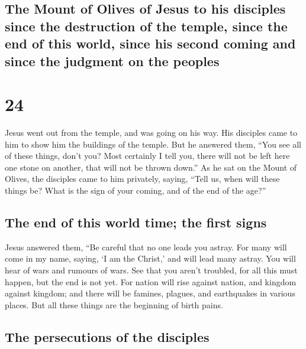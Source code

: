 \hypertarget{the-mount-of-olives-of-jesus-to-his-disciples-since-the-destruction-of-the-temple-since-the-end-of-this-world-since-his-second-coming-and-since-the-judgment-on-the-peoples}{%
\subsection{The Mount of Olives of Jesus to his disciples since the
destruction of the temple, since the end of this world, since his second
coming and since the judgment on the
peoples}\label{the-mount-of-olives-of-jesus-to-his-disciples-since-the-destruction-of-the-temple-since-the-end-of-this-world-since-his-second-coming-and-since-the-judgment-on-the-peoples}}

\hypertarget{section-23}{%
\section{24}\label{section-23}}

 Jesus went out from the temple, and was going on his way.
His disciples came to him to show him the buildings of the temple.
 But he answered them, ``You see all of these things,
don't you? Most certainly I tell you, there will not be left here one
stone on another, that will not be thrown down.''  As he
sat on the Mount of Olives, the disciples came to him privately, saying,
``Tell us, when will these things be? What is the sign of your coming,
and of the end of the age?''

\hypertarget{the-end-of-this-world-time-the-first-signs}{%
\subsection{The end of this world time; the first
signs}\label{the-end-of-this-world-time-the-first-signs}}

 Jesus answered them, ``Be careful that no one leads you
astray.  For many will come in my name, saying, `I am the
Christ,' and will lead many astray.  You will hear of wars
and rumours of wars. See that you aren't troubled, for all this must
happen, but the end is not yet.  For nation will rise
against nation, and kingdom against kingdom; and there will be famines,
plagues, and earthquakes in various places.  But all these
things are the beginning of birth pains.

\hypertarget{the-persecutions-of-the-disciples}{%
\subsection{The persecutions of the
disciples}\label{the-persecutions-of-the-disciples}}

